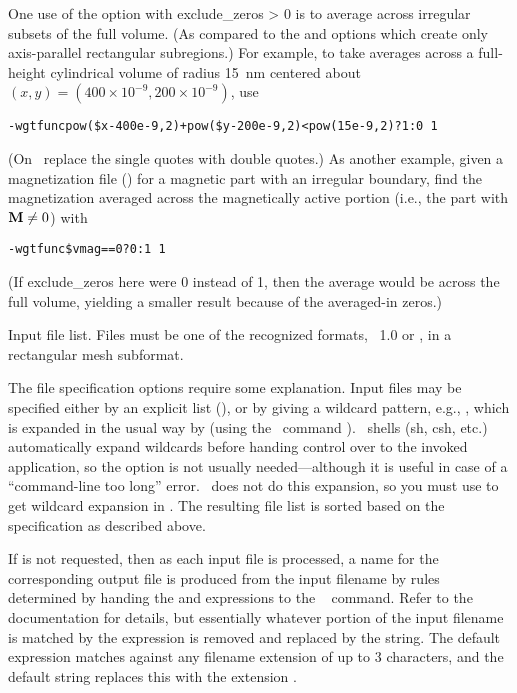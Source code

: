 \begin{description}
  One use of the  option with exclude\_zeros > 0 is to
  average across irregular subsets of the full volume. (As compared to
  the  and  options which create only
  axis-parallel rectangular subregions.) For example, to take averages
  across a full-height cylindrical volume of radius 15~nm centered about
  $(x,y) = (400\times 10^{-9},200\times 10^{-9})$, use
\begin{alltt}
   -wgtfunc {\ssquote}pow(\$x-400e-9,2)+pow(\$y-200e-9,2)<pow(15e-9,2) ? 1 : 0\ssquote\ 1
\end{alltt}
  (On \Windows\ replace the single quotes with double quotes.) As
  another example, given a magnetization file () for a magnetic
  part with an irregular boundary, find the magnetization
  averaged across the magnetically active portion (i.e., the part with
  $\textbf{M}\neq0$) with
\begin{alltt}
   -wgtfunc \ssquote\$vmag == 0 ? 0 : 1\ssquote\ 1
\end{alltt}
  (If exclude\_zeros here were 0 instead of 1, then the average
  would be across the full volume, yielding a smaller result
  because of the averaged-in zeros.)

\item[\optkey{infile \ldots}]
  Input file list.  Files must be one of the recognized
  formats,  \OVF\ 1.0 or \VIO, in a rectangular mesh subformat.
\end{description}

The file specification options require some explanation.  Input files
may be specified either by an explicit list (),
or by giving a wildcard pattern, e.g., , which is
expanded in the usual way by  (using the \Tcl\ command
).   \Unix\ shells (sh, csh, etc.) automatically expand
wildcards before handing control over to the invoked application, so the
 option is not usually needed---although it is useful in case of a
``command-line too long'' error.  \DOS\ does not do this expansion, so
you must use  to get wildcard
expansion in \Windows.
The resulting file list is sorted  based on the 
specification as described above.

If  is not requested, then as each input file is
processed, a name for the corresponding output file is produced from
the input filename by rules determined by handing the 
and  expressions to the \Tcl\  command.  Refer
to the \Tcl\  documentation for details, but essentially
whatever portion of the input filename is matched by the 
expression is removed and replaced by the  string.  The
default  expression matches against any filename
extension of up to 3 characters, and the default  string
replaces this with the extension .

